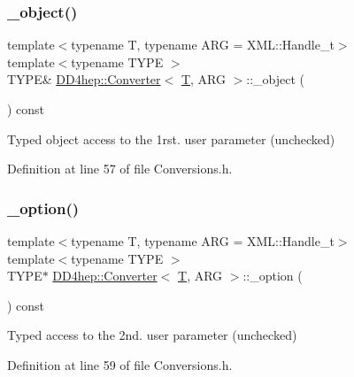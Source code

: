 \subsubsection{\texorpdfstring{\+\_\+object()}{\_object()}}
{\footnotesize\ttfamily template$<$typename T, typename A\+RG = X\+M\+L\+::\+Handle\+\_\+t$>$ \\
template$<$typename T\+Y\+PE $>$ \\
T\+Y\+PE\& \hyperlink{struct_d_d4hep_1_1_converter}{D\+D4hep\+::\+Converter}$<$ \hyperlink{class_t}{T}, A\+RG $>$\+::\+\_\+object (\begin{DoxyParamCaption}{ }\end{DoxyParamCaption}) const\hspace{0.3cm}{\ttfamily [inline]}}



Typed object access to the 1rst. user parameter (unchecked) 



Definition at line 57 of file Conversions.\+h.

\hypertarget{struct_d_d4hep_1_1_converter_a913c3e6a261d4b78972a1f73f28cfcd5}{}\label{struct_d_d4hep_1_1_converter_a913c3e6a261d4b78972a1f73f28cfcd5} 
\subsubsection{\texorpdfstring{\+\_\+option()}{\_option()}}
{\footnotesize\ttfamily template$<$typename T, typename A\+RG = X\+M\+L\+::\+Handle\+\_\+t$>$ \\
template$<$typename T\+Y\+PE $>$ \\
T\+Y\+PE$\ast$ \hyperlink{struct_d_d4hep_1_1_converter}{D\+D4hep\+::\+Converter}$<$ \hyperlink{class_t}{T}, A\+RG $>$\+::\+\_\+option (\begin{DoxyParamCaption}{ }\end{DoxyParamCaption}) const\hspace{0.3cm}{\ttfamily [inline]}}



Typed access to the 2nd. user parameter (unchecked) 



Definition at line 59 of file Conversions.\+h.

\hypertarget{struct_d_d4hep_1_1_converter_ad0b878727e33581fc9dbe6c031a40d92}{}\label{struct_d_d4hep_1_1_converter_ad0b878727e33581fc9dbe6c031a40d92} 
